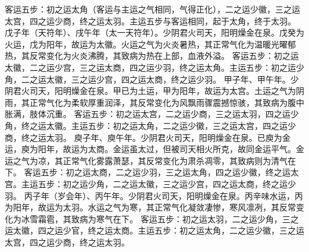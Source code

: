 \documentclass[12pt,UTF8]{ctexbook}
\begin{document}
客运五步：初之运太角（客运与主运之气相同，气得正化），二之运少徽，三之运太宫，四之运少商，终之运太羽。主运五步与客运相同，起于太角，终于太羽。
戊子年（天符年）、戌午年（太一天符年）。少阴君火司天，阳明燥金在泉。戊癸为火运，戊为阳年，故运为太徽。火运之气为火炎暑热，其正常气化为温暖光曜郁热，其反常变化为火炎沸腾，其致病为热在上部，血液外溢。
客运五步：初之运太徽，二之运少宫，三之运太商，四之运少羽，终之运太角。主运五步：初之运少角，二之运太徽，三之运少宫，四之运太商，终之运少羽。
甲子年、甲午年。少阴君火司天，阳明燥金在泉。甲已为土运，甲为阳年，故运为太宫。土运之气为阴雨，其正常气化为柔软厚重润泽，其反常变化为风飘雨骤震撼惊骇，其致病为腹中胀满，肢体沉重。
客运五步：初之运太宫，二之运少商，三之运太羽，四之运少角，终之运太徽。主运五步：初之运太角，二之运少徽，三之运太宫，四之运少商，终之运太羽。
庾子年、庾午年。少阴君火司天，阳明燥金在泉。已庾为金运，庾为阳年，故运为太商。金运虽太过，但被司天相火所克，故同金运平气。金运之气为凉，其正常气化雾露萧瑟，其反常变化为肃杀凋零，其致病则为清气在下。
客运五步：初之运太商，二之运少羽，三之运太角，四之运少徽，终之运太宫。主运五步：初之运少角，二之运太徽，三之运少宫，四之运太商，终之运少羽。
丙子年（岁会年）、丙午年。少阴君火司天，阳明燥金在泉。丙辛味水运，丙为阳年，故运为太羽。水运之气为寒，其正常气化凝敛凄惨，寒风凛冽，其反常变化为冰雪霜雹，其致病为寒气在下。
客运五步：初之运太羽，二之运少角，三之运太徽，四之运少官，终之运太商。主运五步：初之运太角，二之运少徽，三之运太宫，四之运少商，终之运太羽。
\end{document}
